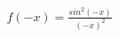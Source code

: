 \documentclass[preview]{standalone}
\begin{document}
\begin{align*}
f(-x)= \frac{sin^2(-x)}{(-x)^2}
\end{align*}
\end{document}
